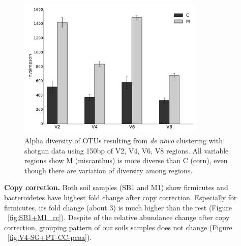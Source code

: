 \documentclass[12pt]{article}
\begin{document}
\begin{figure}[tbph!]
  \centering
  \includegraphics[width=0.8\textwidth]{figs/compare_vregion_alpha.pdf}
  \caption[Alpha diversity of OTUs resulting from {\em de novo} clustering with shotgun data using 150bp of V2, V4, V6, V8 regions]{Alpha diversity of OTUs resulting from {\em de novo} clustering with shotgun data using 150bp of V2, V4, V6, V8 regions. All variable regions show M (miscanthus) is more diverse than C (corn), even though there are variation of diversity among regions.}
  \label{fig:compare_vregion_alpha}
\end{figure}

{\bf Copy corretion. } 
Both soil samples (SB1 and M1) show firmicutes and bacteroidetes have highest fold change after copy correction. Especially for firmicutes, its fold change (about 3) is much higher than the rest (Figure ~\ref{fig:SB1+M1_cc}). Despite of the relative abundance change after copy correction, grouping pattern of our soils samples does not change (Figure ~\ref{fig:V4-SG+PT-CC-pcoa}).
\end{document}
